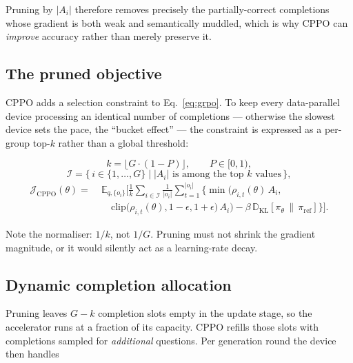 \documentclass[11pt,a4paper]{article}
\newcommand{\Adv}{A}
\newcommand{\polref}{\pi_{\mathrm{ref}}}
\newcommand{\pol}{\pi_{\theta}}
\begin{document}
Pruning by $|\Adv_i|$ therefore removes precisely the partially-correct
completions whose gradient is both weak and semantically muddled, which is why
CPPO can \emph{improve} accuracy rather than merely preserve it.

\subsection{The pruned objective}

CPPO adds a selection constraint to Eq.~\eqref{eq:grpo}. To keep every data-parallel
device processing an identical number of completions --- otherwise the slowest
device sets the pace, the ``bucket effect'' --- the constraint is expressed as
a per-group top-$k$ rather than a global threshold:

\begin{equation}
\label{eq:k}
k = \lfloor G \cdot (1 - P) \rfloor, \qquad P \in [0,1),
\end{equation}
\begin{equation}
\label{eq:index-set}
\mathcal{I} = \big\{\, i \in \{1,\dots,G\} \;\big|\; |\Adv_i| \text{ is among the top } k \text{ values} \,\big\},
\end{equation}
\begin{equation}
\label{eq:cppo}
\begin{split}
\mathcal{J}_{\mathrm{CPPO}}(\theta) =\;
&\mathbb{E}_{q,\{o_i\}} \Bigg[ \frac{1}{k}\sum_{i \in \mathcal{I}} \frac{1}{|o_i|}
\sum_{t=1}^{|o_i|} \Big\{ \min\Big( \rho_{i,t}(\theta)\, \Adv_i,\\
&\quad \mathrm{clip}\big(\rho_{i,t}(\theta), 1-\epsilon, 1+\epsilon\big)\, \Adv_i \Big)
- \beta\, \mathbb{D}_{\mathrm{KL}}\!\left[\pol \,\|\, \polref\right] \Big\} \Bigg].
\end{split}
\end{equation}

Note the normaliser: $1/k$, not $1/G$. Pruning must not shrink the gradient
magnitude, or it would silently act as a learning-rate decay.

\subsection{Dynamic completion allocation}

Pruning leaves $G-k$ completion slots empty in the update stage, so the
accelerator runs at a fraction of its capacity. CPPO refills those slots with
completions sampled for \emph{additional} questions. Per generation round the
device then handles
\end{document}
